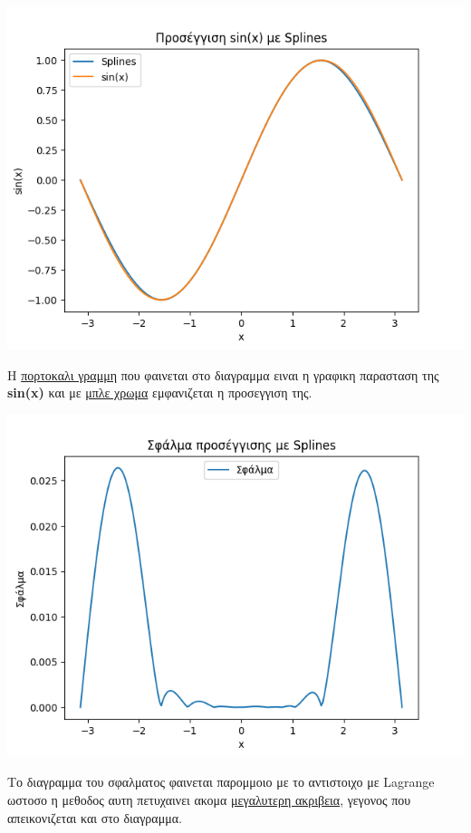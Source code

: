 \documentclass[a4paper,11pt]{article}
\begin{document}
\begin{enumerate}
\begin{center}
			\emph{\includegraphics[scale=0.75]{splines.png}}
		\end{center}
		\begin{center}
			Η \underline{πορτοκαλι γραμμη} που φαινεται στο διαγραμμα ειναι η γραφικη παρασταση της \textbf{sin(x)} και με \underline{μπλε χρωμα} εμφανιζεται η προσεγγιση της.
		\end{center}
		\begin{center}
			\emph{\includegraphics[scale=0.75]{splinesError.png}}
		\end{center}
		\begin{center}
			Το διαγραμμα του σφαλματος φαινεται παρομμοιο με το αντιστοιχο με Lagrange ωστοσο η μεθοδος αυτη πετυχαινει ακομα \underline{μεγαλυτερη ακριβεια}, γεγονος που απεικονιζεται και στο διαγραμμα.
		\end{center}
		

\end{enumerate}
\end{document}
